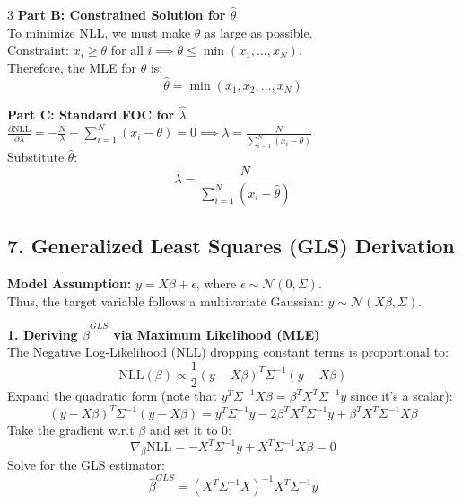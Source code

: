 \documentclass[10pt,landscape]{article}
\begin{document}
\begin{multicols*}{3}
\textbf{Part B: Constrained Solution for $\hat{\theta}$} \\
To minimize NLL, we must make $\theta$ as large as possible. \\
Constraint: $x_i \ge \theta$ for all $i \implies \theta \le \min(x_1, \dots, x_N)$. \\
Therefore, the MLE for $\theta$ is:
$$ \hat{\theta} = \min(x_1, x_2, \dots, x_N) $$

\textbf{Part C: Standard FOC for $\hat{\lambda}$} \\
$\frac{\partial \text{NLL}}{\partial \lambda} = -\frac{N}{\lambda} + \sum_{i=1}^N (x_i - \theta) = 0 \implies \lambda = \frac{N}{\sum_{i=1}^N (x_i - \theta)}$ \\
Substitute $\hat{\theta}$:
$$ \hat{\lambda} = \frac{N}{\sum_{i=1}^N (x_i - \hat{\theta})} $$

\subsection*{7. Generalized Least Squares (GLS) Derivation}

\textbf{Model Assumption:} $y = X\beta + \epsilon$, where $\epsilon \sim \mathcal{N}(0, \Sigma)$. \\
Thus, the target variable follows a multivariate Gaussian: $y \sim \mathcal{N}(X\beta, \Sigma)$.

\textbf{1. Deriving $\hat{\beta}^{GLS}$ via Maximum Likelihood (MLE)} \\
The Negative Log-Likelihood (NLL) dropping constant terms is proportional to:
$$ \text{NLL}(\beta) \propto \frac{1}{2}(y - X\beta)^T \Sigma^{-1} (y - X\beta) $$
Expand the quadratic form (note that $y^T \Sigma^{-1} X\beta = \beta^T X^T \Sigma^{-1} y$ since it's a scalar):
$$ (y - X\beta)^T \Sigma^{-1} (y - X\beta) = y^T \Sigma^{-1} y - 2\beta^T X^T \Sigma^{-1} y + \beta^T X^T \Sigma^{-1} X \beta $$
Take the gradient w.r.t $\beta$ and set it to 0:
$$ \nabla_\beta \text{NLL} = -X^T \Sigma^{-1} y + X^T \Sigma^{-1} X \beta = 0 $$
Solve for the GLS estimator:
$$ \hat{\beta}^{GLS} = (X^T \Sigma^{-1} X)^{-1} X^T \Sigma^{-1} y $$


\end{multicols*}
\end{document}
